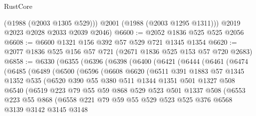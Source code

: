 \begin{lexlean}{RustCore}
\begin{coremodule}
          (@1988 (@2003 @1305 @529)))
        @2001
        (@1988 (@2003 @1295 @1311)))
      @2019
      @2023
      @2028
      @2033
      @2039
      @2046)
@6600 := @2052 @1836 @525 @525 @2056
@6608 := @6600 @1321 @156 @392 @57 @529 @721 @1345 @1354
@6620 := @2077 @1836 @525 @156 @57 @721 (@2671 @1836 @525 @153 @57 @720 @2683)
@6858 := @6330
    (@6355
      (@6396
        (@6398
          (@6400
            (@6421
              (@6444
                (@6461
                  (@6474
                    (@6485
                      (@6489
                        (@6500
                          (@6596
                            (@6608
                              @6620
                              (@6511
                                @391
                                @1883
                                @57
                                @1345
                                @1352
                                @535
                                (@6520
                                  @390
                                  @55
                                  @380
                                  @511
                                  @1344
                                  @1351
                                  @501
                                  @1327
                                  @508
                                  @6540
                                  (@6519
                                    @223
                                    @79
                                    @55
                                    @59
                                    @868
                                    @529
                                    @523
                                    @501
                                    @1337
                                    @508
                                    (@6553
                                      @223
                                      @55
                                      @868
                                      (@6558
                                        @221
                                        @79
                                        @59
                                        @55
                                        @529
                                        @523
                                        @525
                                        @376
                                        @6568
                                        @3139
                                        @3142
                                        @3145
                                        @3148

\end{coremodule}
\end{lexlean}
